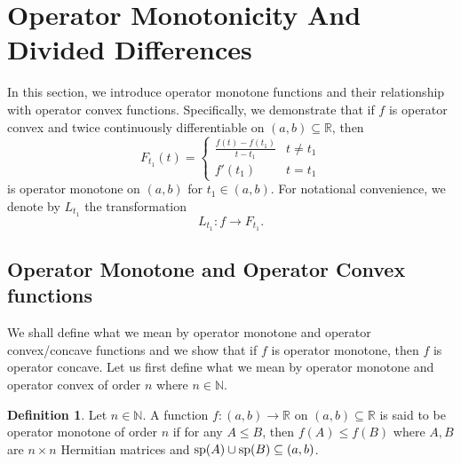 \documentclass[12pt,a4paper]{amsart}
\theoremstyle{definition}
\newtheorem{definition}[theorem]{Definition}
\begin{document}
		\section{Operator Monotonicity And Divided Differences}
	In this section, we introduce operator monotone functions and their relationship with operator convex functions. Specifically, we demonstrate that if $f$ is operator convex and twice continuously differentiable on $(a, b) \subseteq \mathbb{R}$, then 
	\begin{equation}\label{divided-difference-function-definition}
		F_{t_1}(t) = 
		\begin{cases} 
			\frac{f(t) - f(t_1)}{t - t_1} &  t \neq t_1 \\
			f'(t_1) & t=t_1
		\end{cases}
	\end{equation}
	is operator monotone on $(a, b)$ for $t_1 \in (a, b)$. For notational convenience, we denote by $L_{t_1}$ the transformation
	\begin{equation}\label{lowner-transformation-to-divided-difference}
		L_{t_1}: f \rightarrow F_{t_1}.
	\end{equation}
	
	\subsection{Operator Monotone and Operator Convex functions}
	We shall define what we mean by operator monotone and operator convex/concave functions and we show that if $f$ is operator monotone, then $f$ is operator concave. Let us first define what we mean by operator monotone and operator convex of order $n$ where $n \in \mathbb{N}$.
	\begin{definition}
		Let $n \in \mathbb{N}$. A function $f: (a, b) \rightarrow \mathbb{R}$ on $(a, b) \subseteq \mathbb{R}$ is said to be operator monotone of order $n$ if for any $A \leq B$, then $f(A) \leq f(B)$ 	where $A, B$ are $n \times n$ Hermitian matrices and $\textnormal{sp}(A) \cup \textnormal{sp}(B) \subseteq (a,b)$.
	\end{definition}
	
\end{document}

